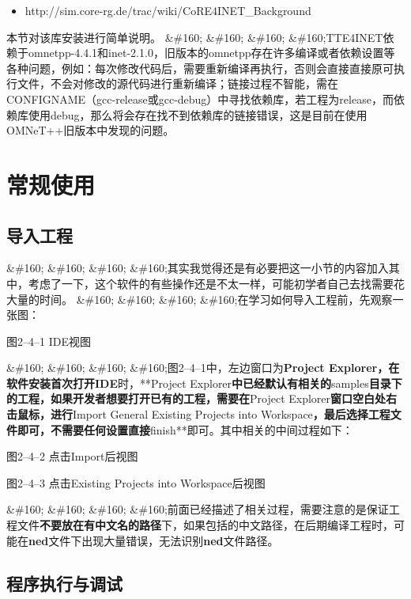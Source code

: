 \begin{itemize}
\item http:\slash \slash sim.core-rg.de\slash trac\slash wiki\slash CoRE4INET\_Background

\end{itemize}

本节对该库安装进行简单说明。
\&\#160; \&\#160; \&\#160; \&\#160;TTE4INET依赖于omnetpp-4.4.1和inet-2.1.0，旧版本的omnetpp存在许多编译或者依赖设置等各种问题，例如：每次修改代码后，需要重新编译再执行，否则会直接直接原可执行文件，不会对修改的源代码进行重新编译；链接过程不智能，需在CONFIGNAME（gcc-release或gcc-debug）中寻找依赖库，若工程为release，而依赖库使用debug，那么将会存在找不到依赖库的链接错误，这是目前在使用OMNeT++旧版本中发现的问题。

\section{常规使用}
\label{常规使用}

\subsection{导入工程}
\label{导入工程}

\&\#160; \&\#160; \&\#160; \&\#160;其实我觉得还是有必要把这一小节的内容加入其中，考虑了一下，这个软件的有些操作还是不太一样，可能初学者自己去找需要花大量的时间。
\&\#160; \&\#160; \&\#160; \&\#160;在学习如何导入工程前，先观察一张图：

图2--4--1 IDE视图

\&\#160; \&\#160; \&\#160; \&\#160;图2--4--1中，左边窗口为\textbf{Project Explorer\textbf{，在软件安装首次打开}IDE}时，**Project Explorer\textbf{中已经默认有相关的}samples\textbf{目录下的工程，如果开发者想要打开已有的工程，需要在}Project Explorer\textbf{窗口空白处右击鼠标，进行}Import \textbar{} General \textbar{} Existing Projects into Workspace\textbf{，最后选择工程文件即可，不需要任何设置直接}finish**即可。其中相关的中间过程如下：

图2--4--2 点击Import后视图

图2--4--3 点击Existing Projects into Workspace后视图

\&\#160; \&\#160; \&\#160; \&\#160;前面已经描述了相关过程，需要注意的是保证工程文件\textbf{不要放在有中文名的路径}下，如果包括的中文路径，在后期编译工程时，可能在\textbf{ned}文件下出现大量错误，无法识别\textbf{ned}文件路径。

\subsection{程序执行与调试}
\label{程序执行与调试}

